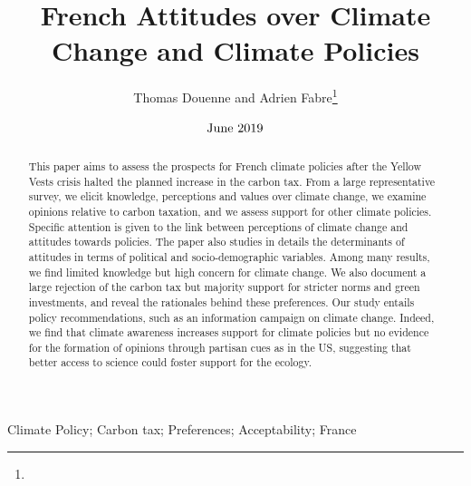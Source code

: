 \documentclass[english,5p,authoryear]{elsarticle}
\begin{document}
\sloppy

\date{$\textnormal{June 2019}$}

\begin{frontmatter}{}
  \title{French Attitudes over Climate Change and Climate Policies
  }
  
\author{Thomas Douenne and Adrien Fabre\footnote{}} 

{}

\begin{abstract}
This paper aims to assess the prospects for French climate policies after the Yellow Vests crisis halted the planned increase in the carbon tax. From a large representative survey, we elicit knowledge, perceptions and values over climate change, we examine opinions relative to carbon taxation, and we assess support for other climate policies. Specific attention is given to the link between perceptions of climate change and attitudes towards policies. The paper also studies in details the determinants of attitudes in terms of political and socio-demographic variables. Among many results, we find limited knowledge but high concern for climate change. We also document a large rejection of the carbon tax but majority support for stricter norms and green investments, and reveal the rationales behind these preferences. Our study entails policy recommendations, such as an information campaign on climate change. Indeed, we find that climate awareness increases support for climate policies but no evidence for the formation of opinions through partisan cues as in the US, suggesting that better access to science could foster support for the ecology.
\end{abstract} %




\begin{keyword}
Climate Policy; Carbon tax; Preferences; Acceptability; France
\end{keyword}
\end{frontmatter}{}
\end{document}
